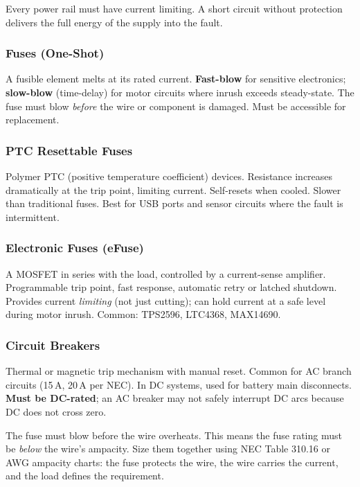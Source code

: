 Every power rail must have current limiting. A short circuit without protection delivers the full energy of the supply into the fault.

\subsubsection{Fuses (One-Shot)}
A fusible element melts at its rated current. \textbf{Fast-blow} for sensitive electronics; \textbf{slow-blow} (time-delay) for motor circuits where inrush exceeds steady-state. The fuse must blow \emph{before} the wire or component is damaged. Must be accessible for replacement.

\subsubsection{PTC Resettable Fuses}
Polymer PTC (positive temperature coefficient) devices. Resistance increases dramatically at the trip point, limiting current. Self-resets when cooled. Slower than traditional fuses. Best for USB ports and sensor circuits where the fault is intermittent.

\subsubsection{Electronic Fuses (eFuse)}
A MOSFET in series with the load, controlled by a current-sense amplifier. Programmable trip point, fast response, automatic retry or latched shutdown. Provides current \emph{limiting} (not just cutting); can hold current at a safe level during motor inrush. Common: TPS2596, LTC4368, MAX14690.

\subsubsection{Circuit Breakers}
Thermal or magnetic trip mechanism with manual reset. Common for AC branch circuits (15\,A, 20\,A per NEC). In DC systems, used for battery main disconnects. \textbf{Must be DC-rated}; an AC breaker may not safely interrupt DC arcs because DC does not cross zero.

\begin{warningbox}
The fuse must blow before the wire overheats. This means the fuse rating must be \emph{below} the wire's ampacity. Size them together using NEC Table 310.16 or AWG ampacity charts: the fuse protects the wire, the wire carries the current, and the load defines the requirement.
\end{warningbox}


